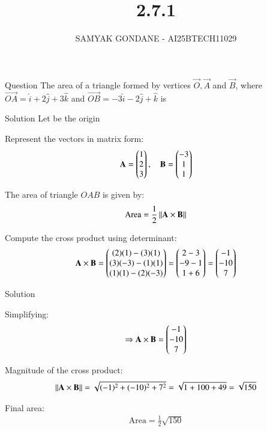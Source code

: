\documentclass{beamer}
\title 
{2.7.1}
\date{}
\author
{SAMYAK GONDANE - AI25BTECH11029}
\begin{document}
\frame{\titlepage}

\begin{frame}{Question}
The area of a triangle formed by vertices $\vec{O}, \vec{A}$ and $\vec{B}$, where $\vec{OA} = \hat{i} + 2\hat{j} + 3\hat{k}$ and $\vec{OB} = -3\hat{i} - 2\hat{j} + \hat{k}$ is
\end{frame}

\begin{frame}{Solution}
Let  be the origin

Represent the vectors in matrix form:
\begin{align}
\mathbf{A} = \begin{pmatrix}1 \\ 2 \\ 3\end{pmatrix}, \quad
\mathbf{B} = \begin{pmatrix}-3 \\ 1 \\ 1\end{pmatrix}
\end{align}

The area of triangle $OAB$ is given by:
\begin{align}
\text{Area} = \frac{1}{2} \left\lVert\mathbf{A} \times \mathbf{B}\right\rVert
\end{align}

Compute the cross product using determinant:
\begin{align}
\mathbf{A} \times \mathbf{B} =
\begin{pmatrix}
(2)(1) - (3)(1) \\
(3)(-3) - (1)(1) \\
(1)(1) - (2)(-3)
\end{pmatrix}
=
\begin{pmatrix}
2 - 3 \\
-9 - 1 \\
1 + 6
\end{pmatrix}
=
\begin{pmatrix}
-1 \\
-10 \\
7
\end{pmatrix}
\end{align}

\end{frame}

\begin{frame}{Solution}

Simplifying:
\begin{align}
\Rightarrow \mathbf{A} \times \mathbf{B} = \begin{pmatrix}-1 \\ -10 \\ 7\end{pmatrix}
\end{align}

Magnitude of the cross product:
\begin{align}
\left\lVert\mathbf{A} \times \mathbf{B}\right\rVert = \sqrt{(-1)^2 + (-10)^2 + 7^2} = \sqrt{1 + 100 + 49} = \sqrt{150}
\end{align}

Final area:
\begin{align}
\text{Area} = \frac{1}{2} \sqrt{150}
\end{align}

\end{frame}
\end{document}
